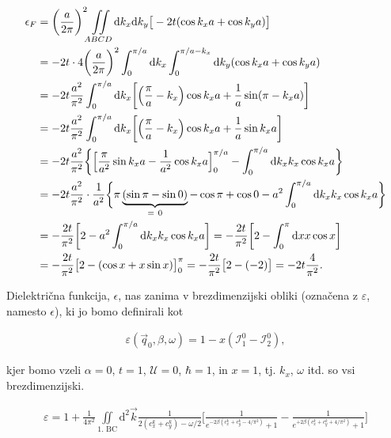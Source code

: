 \documentclass[a4paper, 12pt]{article}
\newcommand{\vq}{
	\ensuremath{\vec{q}}
}
\newcommand{\w}{
	\ensuremath{\omega}
}
\newcommand{\e}{
	\ensuremath{\epsilon}
}
\newcommand{\vk}{
	\ensuremath{\vec{k}}
}
\newcommand{\dd}{
	\ensuremath{\text{d}}
}
\newcommand{\I}{
	\ensuremath{\mathcal{I}}
}
\begin{document}
\begin{align}
	\e_F &= \bigg(\frac{a}{2\pi}\bigg)^2 \iint\limits_{ABCD} \dd k_x \dd k_y \big[-2t (\cos k_x a + \cos k_y a)
		\big] \notag \\
	&= -2t \cdot 4 \bigg(\frac{a}{2\pi}\bigg)^2 \int_0^{\pi/a} \dd k_x \int_0^{\pi/a - k_x} \dd k_y (\cos k_x a +
		\cos k_y a) \notag \\
	&= -2t \frac{a^2}{\pi^2} \int_0^{\pi/a} \dd k_x \bigg[\Big(\frac{\pi}{a} - k_x\Big)\cos k_x a +
		\frac{1}{a}\sin(\pi - k_x a)\bigg] \notag \\
	&= -2t \frac{a^2}{\pi^2} \int_0^{\pi/a} \dd k_x \bigg[\Big(\frac{\pi}{a} - k_x\Big)\cos k_x a +
		\frac{1}{a}\sin k_x a \bigg] \notag \\
	&= -2t \frac{a^2}{\pi^2} \bigg\{\Big[\frac{\pi}{a^2}\sin k_x a - \frac{1}{a^2}\cos k_x a\Big]_0^{\pi/a} -
		\int_0^{\pi/a} \dd k_x k_x \cos k_x a\bigg\} \notag \\
	&= -2t \frac{a^2}{\pi^2} \cdot \frac{1}{a^2} \bigg\{\pi \underbrace{(\sin\pi - \sin 0)}_{=\ 0} - \cos\pi + \cos 0 - a^2
		\int_0^{\pi/a} \dd k_x k_x \cos k_x a\bigg\} \notag \\
	&= -\frac{2t}{\pi^2} \bigg[2 - a^2 \int_0^{\pi/a} \dd k_x k_x \cos k_x a\bigg] = -\frac{2t}{\pi^2}
		\bigg[2 - \int_0^\pi \dd x x \cos x\bigg] \notag \\
	&= -\frac{2t}{\pi^2}\big[2 - (\cos x + x\sin x)\big]_0^\pi = -\frac{2t}{\pi^2} \big[2 - (-2)\big] =
		-2t \frac{4}{\pi^2}.
\end{align}

Dielektri\v cna funkcija, $\e$, nas zanima v brezdimenzijski obliki (ozna\v cena z $\varepsilon$, namesto $\e$), ki jo bomo
definirali kot

\begin{align}
	\varepsilon (\vq_0, \beta, \w) = 1 - x (\I^0_1 - \I^0_2),
\end{align}

kjer bomo vzeli $\alpha = 0$, $t = 1$, $\mathcal{U} = 0$, $\hbar = 1$, in $x = 1$, tj. $k_x$, $\w$ itd. so vsi brezdimenzijski.

\begin{align}
	\varepsilon = 1 + \frac{1}{4\pi^2}\iint\limits_\text{1. BC} \dd^2 \vk \frac{1}{2(c_x^k + c_y^k) - \w/2}
		\bigg[\frac{1}{e^{-2\beta(c_x^k + c_y^k - 4/\pi^2)} + 1} - \frac{1}{e^{+2\beta(c_x^k + c_y^k + 4/\pi^2)} + 1}\bigg]
\end{align}
\end{document}
